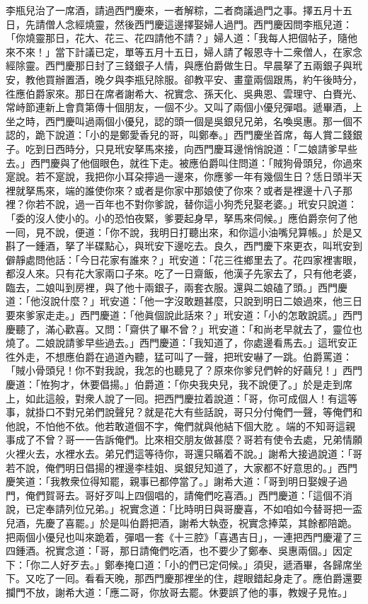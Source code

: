 李瓶兒治了一席酒，請過西門慶來，一者解粽，二者商議過門之事。擇五月十五日，先請僧人念經燒靈，然後西門慶這邊擇娶婦人過門。西門慶因問李瓶兒道：「你燒靈那日，花大、花三、花四請他不請？」{}婦人道：「我每人把個帖子，隨他來不來！」當下計議已定，單等五月十五日，婦人請了報恩寺十二衆僧人，在家念經除靈。西門慶那日封了三錢銀子人情，與應伯爵做生日。早晨拏了五兩銀子與玳安，教他買辦置酒，晚夕與李瓶兒除服。卻教平安、畫童兩個跟馬，約午後時分，徃應伯爵家來。那日在席者謝希大、祝實念、孫天化、吳典恩、雲理守、白賚光、常峙節連新上會賁第傳十個朋友，一個不少。{}又叫了兩個小優兒彈唱。遞畢酒，上坐之時，西門慶叫過兩個小優兒，認的頭一個是吳銀兒兄弟，名喚吳惠。那一個不認的，{}跪下說道：「小的是鄭愛香兒的哥，叫鄭奉。」西門慶坐首席，每人賞二錢銀子。吃到日西時分，只見玳安拏馬來接，向西門慶耳邊悄悄說道：「二娘請爹早些去。」西門慶與了他個眼色，就徃下走。{}被應伯爵叫住問道：「賊狗骨頭兒，你過來寔說。若不寔說，我把你小耳朶擰過一邊來，你應爹一年有幾個生日？恁日頭半天裡就拏馬來，端的誰使你來？或者是你家中那娘使了你來？或者是裡邊十八子那裡？你若不說，過一百年也不對你爹說，替你這小狗禿兒娶老婆。」玳安只說道：「委的沒人使小的。小的恐怕夜緊，爹要起身早，拏馬來伺候。」應伯爵奈何了他一囘，見不說，便道：「你不說，我明日打聽出來，和你這小油嘴兒算帳。」於是又斟了一鍾酒，拏了半碟點心，與玳安下邊吃去。良久，西門慶下來更衣，叫玳安到僻靜處問他話：「今日花家有誰來？」{}玳安道：「花三徃鄉里去了。花四家裡害眼，都沒人來。只有花大家兩口子來。吃了一日齋飯，他漢子先家去了，只有他老婆，臨去，二娘叫到房裡，與了他十兩銀子，兩套衣服。還與二娘磕了頭。」西門慶道：「他沒說什麼？」玳安道：「他一字沒敢題甚麼，只說到明日二娘過來，他三日要來爹家走走。」西門慶道：「他眞個說此話來？」{}玳安道：「小的怎敢說謊。」西門慶聽了，滿心歡喜。又問：「齋供了畢不曾？」玳安道：「和尚老早就去了，靈位也燒了。二娘說請爹早些過去。」西門慶道：「我知道了，你處邊看馬去。」這玳安正徃外走，不想應伯爵在過道內聽，猛可叫了一聲，把玳安嚇了一跳。伯爵罵道：「賊小骨頭兒！你不對我說，我怎的也聽見了？原來你爹兒們幹的好繭兒！」西門慶道：「恠狗才，休要倡揚。」伯爵道：「你央我央兒，我不說便了。」於是走到席上，如此這般，對衆人說了一囘。把西門慶拉着說道：「哥，你可成個人！有這等事，就掛口不對兄弟們說聲兒？就是花大有些話說，哥只分付俺們一聲，等俺們和他說，不怕他不依。他若敢道個不字，俺們就與他結下個大肐𦞂。端的不知哥這親事成了不曾？哥一一告訴俺們。比來相交朋友做甚麼？哥若有使令去處，兄弟情願火裡火去，水裡水去。弟兄們這等待你，哥還只瞞着不說。」{}謝希大接過說道：「哥若不說，俺們明日倡揚的裡邊李桂姐、吳銀兒知道了，大家都不好意思的。」西門慶笑道：「我教衆位得知罷，親事已都停當了。」謝希大道：「哥到明日娶嫂子過門，俺們賀哥去。哥好歹叫上四個唱的，請俺們吃喜酒。」西門慶道：「這個不消說，已定奉請列位兄弟。」祝實念道：「比時明日與哥慶喜，不如咱如今替哥把一盃兒酒，先慶了喜罷。」{}於是叫伯爵把酒，謝希大執壺，祝實念捧菜，其餘都陪跪。把兩個小優兒也叫來跪着，彈唱一套《十三腔》「喜遇吉日」，一連把西門慶灌了三四鍾酒。祝實念道：「哥，那日請俺們吃酒，也不要少了鄭奉、吳惠兩個。」因定下：「你二人好歹去。」鄭奉掩口道：「小的們已定伺候。」須臾，遞酒畢，各歸席坐下。又吃了一囘。看看天晚，那西門慶那裡坐的住，趕眼錯起身走了。應伯爵還要攔門不放，謝希大道：「應二哥，你放哥去罷。休要誤了他的事，教嫂子見恠。」


